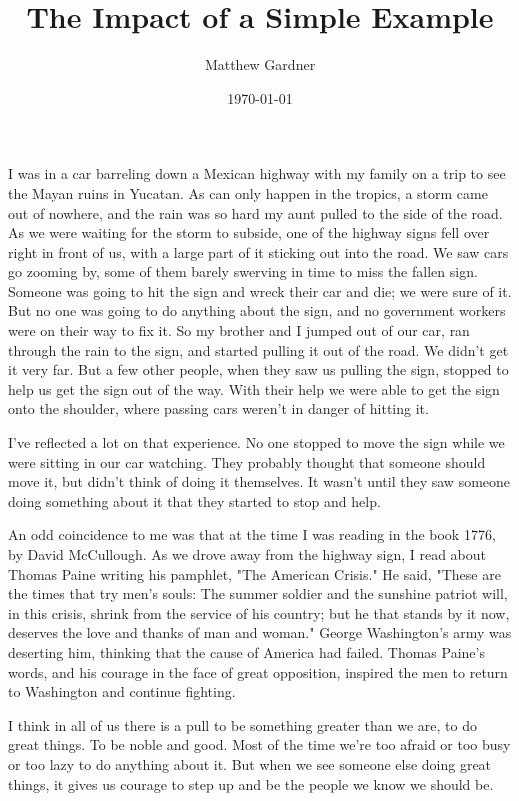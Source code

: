 \documentclass[onecolumn, 11pt]{article}
\title{The Impact of a Simple Example}
\author{Matthew Gardner}
\date{\today}
\begin{document}
\maketitle
I was in a car barreling down a Mexican highway with my family on a trip to see
the Mayan ruins in Yucatan.  As can only happen in the tropics, a storm came
out of nowhere, and the rain was so hard my aunt pulled to the side of the
road.  As we were waiting for the storm to subside, one of the highway signs
fell over right in front of us, with a large part of it sticking out into the
road.  We saw cars go zooming by, some of them barely swerving in time to miss
the fallen sign.  Someone was going to hit the sign and wreck their car and
die; we were sure of it.  But no one was going to do anything about the sign,
and no government workers were on their way to fix it.  So my brother and I
jumped out of our car, ran through the rain to the sign, and started pulling it
out of the road.  We didn't get it very far.  But a few other people, when they
saw us pulling the sign, stopped to help us get the sign out of the way.  With
their help we were able to get the sign onto the shoulder, where passing cars
weren't in danger of hitting it.

I've reflected a lot on that experience.  No one stopped to move the sign while
we were sitting in our car watching.  They probably thought that someone should
move it, but didn't think of doing it themselves.  It wasn't until they saw
someone doing something about it that they started to stop and help.

An odd coincidence to me was that at the time I was reading in the book 1776,
by David McCullough.  As we drove away from the highway sign, I read about
Thomas Paine writing his pamphlet, "The American Crisis."  He said, "These are
the times that try men's souls: The summer soldier and the sunshine patriot
will, in this crisis, shrink from the service of his country; but he that
stands by it now, deserves the love and thanks of man and woman."  George
Washington's army was deserting him, thinking that the cause of America had
failed.  Thomas Paine's words, and his courage in the face of great opposition,
inspired the men to return to Washington and continue fighting.

I think in all of us there is a pull to be something greater than we are, to do
great things.  To be noble and good.  Most of the time we're too afraid or too
busy or too lazy to do anything about it.  But when we see someone else doing
great things, it gives us courage to step up and be the people we know we
should be.
\end{document}
